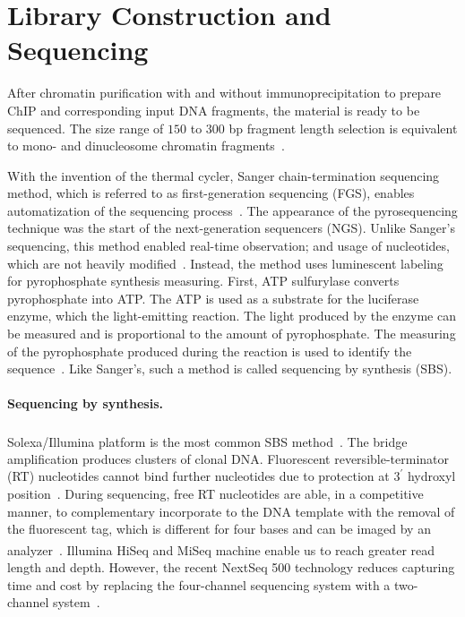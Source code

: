 











\section{Library Construction and Sequencing}

After chromatin purification with and without immunoprecipitation to prepare ChIP and corresponding input DNA fragments, the material is ready to be sequenced. 
The size range of $150$ to $300$ bp fragment length selection is equivalent to mono- and dinucleosome chromatin fragments~\cite{kidder2011chip}.

With the invention of the thermal cycler,  Sanger chain-termination sequencing method, which is referred to as first-generation sequencing (FGS), enables automatization of the sequencing process~\cite{quail2012tale}. 
The appearance of the pyrosequencing technique was the start of the next-generation sequencers (NGS). 
Unlike Sanger's sequencing, this method enabled real-time observation; and usage of nucleotides, which are not heavily modified~\cite{ronaghi1996real, ronaghi1998sequencing}.
Instead, the method uses luminescent labeling for pyrophosphate synthesis measuring. 
First, ATP sulfurylase converts pyrophosphate into ATP. 
The ATP is used as a substrate for the luciferase enzyme, which the light-emitting reaction. 
The light produced by the enzyme can be measured and is proportional to the amount of pyrophosphate. 
The measuring of the pyrophosphate produced during the reaction is used to identify the sequence~\cite{hyman1988new}. 
Like Sanger's, such a method is called sequencing by synthesis (SBS).

\paragraph{Sequencing by synthesis.}
Solexa/Illumina\textsuperscript{\texttrademark} platform is the most common SBS method~\cite{voelkerding2009next}. 
The bridge amplification produces clusters of clonal DNA. 
Fluorescent reversible-terminator (RT) nucleotides cannot bind further nucleotides due to protection at $3^\prime$ hydroxyl position~\cite{heather2016sequence}. 
During sequencing, free RT nucleotides are able, in a competitive manner, to complementary incorporate to the DNA template with the removal of the fluorescent tag, which is different for four bases and can be imaged by an analyzer~\cite{berglund2011next}. 
Illumina\textsuperscript{\texttrademark} HiSeq and MiSeq machine enable us to reach greater read length and depth. 
However, the recent NextSeq 500 technology reduces capturing time and cost by replacing the four-channel sequencing system with a two-channel system~\cite{reuter2015high}. 



